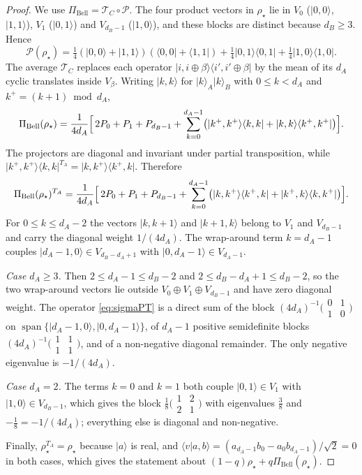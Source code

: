 \documentclass[11pt,a4paper]{article}
\theoremstyle{definition}
\theoremstyle{remark}
\newcommand{\ket}[1]{\lvert #1\rangle}
\newcommand{\bra}[1]{\langle #1\rvert}
\newcommand{\ketbra}[2]{\lvert #1\rangle\langle #2\rvert}
\newcommand{\braket}[2]{\langle #1\vert #2\rangle}
\newcommand{\dA}{d_A}
\newcommand{\dB}{d_B}
\newcommand{\PiB}{\Pi_{\mathrm{Bell}}}
\newcommand{\cP}{\mathcal{P}}
\newcommand{\cC}{\mathcal{T}_{C}}
\DeclareMathOperator{\spn}{span}
\begin{document}
\begin{proof}
We use $\PiB=\cC\circ\cP$. The four product vectors in $\rho_\star$ lie in
$V_0$ ($\ket{0,0}$, $\ket{1,1}$), $V_1$ ($\ket{0,1}$) and $V_{\dB-1}$ ($\ket{1,0}$), and
these blocks are distinct because $\dB\ge3$. Hence
\begin{equation*}
\cP(\rho_\star)=\tfrac14(\ket{0,0}+\ket{1,1})(\bra{0,0}+\bra{1,1})
+\tfrac14\ketbra{0,1}{0,1}+\tfrac14\ketbra{1,0}{1,0}.
\end{equation*}
The average $\cC$ replaces each operator $\ketbra{i,i\oplus\beta}{i',i'\oplus\beta}$ by the
mean of its $\dA$ cyclic translates inside $V_\beta$. Writing $\ket{k,k}$ for
$\ket{k}_A\ket{k}_B$ with $0\le k<\dA$ and $k^{+}=(k+1)\bmod\dA$,
\begin{equation}\label{eq:sigma}
\PiB(\rho_\star)=\frac{1}{4\dA}\Bigl[\,2P_0+P_1+P_{\dB-1}
+\sum_{k=0}^{\dA-1}\bigl(\ketbra{k^{+},k^{+}}{k,k}+\ketbra{k,k}{k^{+},k^{+}}\bigr)\Bigr].
\end{equation}
The projectors are diagonal and invariant under partial transposition, while
$\ketbra{k^{+},k^{+}}{k,k}^{T_A}=\ketbra{k,k^{+}}{k^{+},k}$. Therefore
\begin{equation}\label{eq:sigmaPT}
\PiB(\rho_\star)^{T_A}=\frac{1}{4\dA}\Bigl[\,2P_0+P_1+P_{\dB-1}
+\sum_{k=0}^{\dA-1}\bigl(\ketbra{k,k^{+}}{k^{+},k}+\ketbra{k^{+},k}{k,k^{+}}\bigr)\Bigr].
\end{equation}
For $0\le k\le\dA-2$ the vectors $\ket{k,k+1}$ and $\ket{k+1,k}$ belong to $V_1$ and
$V_{\dB-1}$ and carry the diagonal weight $1/(4\dA)$. The wrap-around term $k=\dA-1$
couples $\ket{\dA-1,0}\in V_{\dB-\dA+1}$ with $\ket{0,\dA-1}\in V_{\dA-1}$.

\emph{Case $\dA\ge3$.} Then $2\le\dA-1\le\dB-2$ and $2\le\dB-\dA+1\le\dB-2$, so the two
wrap-around vectors lie outside $V_0\oplus V_1\oplus V_{\dB-1}$ and have zero diagonal
weight. The operator \eqref{eq:sigmaPT} is a direct sum of the block
$(4\dA)^{-1}\bigl(\begin{smallmatrix}0&1\\1&0\end{smallmatrix}\bigr)$ on
$\spn\{\ket{\dA-1,0},\ket{0,\dA-1}\}$, of $\dA-1$ positive semidefinite blocks
$(4\dA)^{-1}\bigl(\begin{smallmatrix}1&1\\1&1\end{smallmatrix}\bigr)$, and of a
non-negative diagonal remainder. The only negative eigenvalue is $-1/(4\dA)$.

\emph{Case $\dA=2$.} The terms $k=0$ and $k=1$ both couple $\ket{0,1}\in V_1$ with
$\ket{1,0}\in V_{\dB-1}$, which gives the block
$\tfrac18\bigl(\begin{smallmatrix}1&2\\2&1\end{smallmatrix}\bigr)$ with eigenvalues
$\tfrac38$ and $-\tfrac18=-1/(4\dA)$; everything else is diagonal and non-negative.

Finally, $\rho_\star^{T_A}=\rho_\star$ because $\ket a$ is real, and
$\braket{v}{a,b}=(a_{\dA-1}b_0-a_0b_{\dA-1})/\sqrt2=0$ in both cases, which gives the
statement about $(1-q)\rho_\star+q\PiB(\rho_\star)$.
\end{proof}
\end{document}
